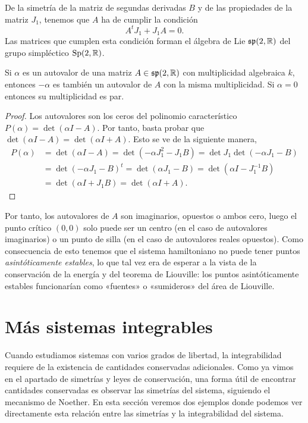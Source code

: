    De la simetría de la matriz de segundas derivadas $B$ y de las propiedades de la matriz $J_1$, tenemos que $A$ ha de cumplir la condición
   \begin{equation*}
     A^{t}J_1+J_1 A=0.
   \end{equation*}
   Las matrices que cumplen esta condición forman el álgebra de Lie $\mathfrak{sp}(2,\mathbb{R})$ del grupo simpléctico $\mathrm{Sp}(2,\mathbb{R})$.

   \begin{prop}
     Si $\alpha$ es un autovalor de una matriz $A\in \mathfrak{sp}(2,\mathbb{R})$ con multiplicidad algebraica $k$, entonces $-\alpha$ es también un autovalor de $A$ con la misma multiplicidad. Si $\alpha=0$ entonces su multiplicidad es par.
   \end{prop}
   \begin{proof}
     Los autovalores son los ceros del polinomio característico $P(\alpha)=\det(\alpha I-A)$. Por tanto, basta probar que $\det(\alpha I-A)=\det(\alpha I + A)$. Esto se ve de la siguiente manera,
     \begin{align*}
       P(\alpha)&=\det(\alpha I-A)=\det(-\alpha J_1^2-J_1B)=\det J_1\det(-\alpha J_1 - B)\\
       &=\det(-\alpha J_1-B)^t=\det (\alpha J_1 - B)=\det(\alpha I - J_1^{-1}B)\\
       &=\det(\alpha I + J_1 B)=\det(\alpha I +A).
     \end{align*}
   \end{proof}
   Por tanto, los autovalores de $A$ son imaginarios, opuestos o ambos cero, luego el punto crítico $(0,0)$ solo puede ser un centro (en el caso de autovalores imaginarios) o un punto de silla (en el caso de autovalores reales opuestos). Como consecuencia de esto tenemos que el sistema hamiltoniano no puede tener puntos \emph{asintóticamente estables}, lo que tal vez era de esperar a la vista de la conservación de la energía y del teorema de Liouville: los puntos asintóticamente estables funcionarían como «fuentes» o «sumideros» del área de Liouville.
   \section{Más sistemas integrables}
   Cuando estudiamos sistemas con varios grados de libertad, la integrabilidad requiere de la existencia de cantidades conservadas adicionales. Como ya vimos en el apartado de simetrías y leyes de conservación, una forma útil de encontrar cantidades conservadas es observar las simetrías del sistema, siguiendo el mecanismo de Noether. En esta sección veremos dos ejemplos donde podemos ver directamente esta relación entre las simetrías y la integrabilidad del sistema.

